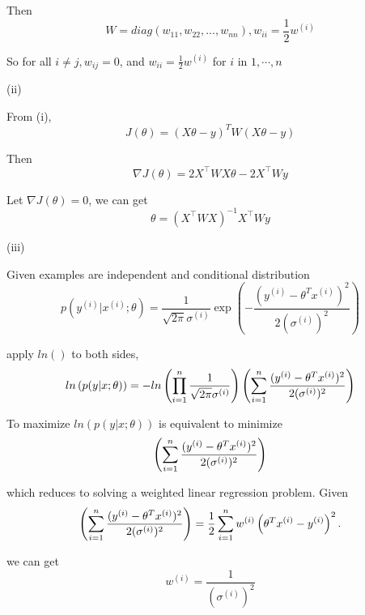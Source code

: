 \begin{answer}
Then 
\begin{equation*}
    W = diag(w_{11}, w_{22}, ..., w_{nn}), w_{ii} = \frac{1}{2} w^{(i)}
\end{equation*}

So for all $i \ne j, w_{ij} = 0$, and $w_{ii} = \frac{1}{2} w^{(i)}$  for $i$ in $1, \cdots, n$

(ii)

From (i), 
\begin{equation*}
    J(\theta) = (X\theta - {y})^T W (X\theta - {y})
\end{equation*}

Then 
\begin{equation*}
    \nabla J(\theta) = 2 X ^ \top W X \theta - 2 X^\top W y
\end{equation*}

Let $\nabla J(\theta) = 0$, we can get
\begin{equation*}
    \theta = (X ^ \top W X)^{-1} X^\top W y
\end{equation*}

(iii)

Given examples are independent and conditional distribution
\begin{equation*}
    p(y^{(i)} | x^{(i)} ; \theta) = \frac{1}{\sqrt{2\pi}\sigma^{(i)}} \exp\left(-
    \frac{(y^{(i)} - \theta^Tx^{(i)})^2}{2(\sigma^{(i)})^2}\right)
\end{equation*}

apply $ln()$ to both sides,
\begin{equation*}
    ln \left(p(y | x ; \theta) \right) = - ln\left( \prod_{i=1}^{n} \frac{1}{\sqrt{2\pi}\sigma^{(i)}} \right) \left( \sum_{i=1}^{n} \frac{(y^{(i)} - \theta^Tx^{(i)})^2}{2(\sigma^{(i)})^2} \right)
\end{equation*}

To maximize $ln \left(p(y | x ; \theta) \right)$ is equivalent to minimize 
\begin{equation*}
\left( \sum_{i=1}^{n} \frac{(y^{(i)} - \theta^Tx^{(i)})^2}{2(\sigma^{(i)})^2} \right)
\end{equation*}

which reduces to solving a weighted linear regression problem. Given 
\begin{equation*}
\left( \sum_{i=1}^{n} \frac{(y^{(i)} - \theta^Tx^{(i)})^2}{2(\sigma^{(i)})^2} \right) = \frac{1}{2} \sum_{i=1}^{n} w^{(i)}
		\left(\theta^Tx^{(i)} - y^{(i)}\right)^2.
\end{equation*}

we can get 
\begin{equation*}
w^{(i)} = \frac{1}{{(\sigma^{(i)})^2}}
\end{equation*}
\end{answer}

